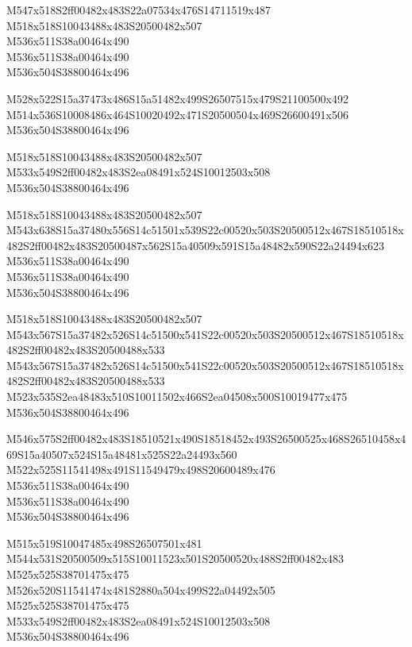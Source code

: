 \documentclass{article}
\begin{document}
\begin{multicols}{5}
\begin{center}
M547x518S2ff00482x483S22a07534x476S14711519x487 %
\\M518x518S10043488x483S20500482x507 %
\\M536x511S38a00464x490 %
\\M536x511S38a00464x490 %
\\M536x504S38800464x496 %

M528x522S15a37473x486S15a51482x499S26507515x479S21100500x492 %
\\M514x536S10008486x464S10020492x471S20500504x469S26600491x506 %
\\M536x504S38800464x496 %

M518x518S10043488x483S20500482x507 %
\\M533x549S2ff00482x483S2ea08491x524S10012503x508 %
\\M536x504S38800464x496 %

M518x518S10043488x483S20500482x507 %
\\M543x638S15a37480x556S14c51501x539S22c00520x503S20500512x467S18510518x482S2ff00482x483S20500487x562S15a40509x591S15a48482x590S22a24494x623 %
\\M536x511S38a00464x490 %
\\M536x511S38a00464x490 %
\\M536x504S38800464x496 %

M518x518S10043488x483S20500482x507 %
\\M543x567S15a37482x526S14c51500x541S22c00520x503S20500512x467S18510518x482S2ff00482x483S20500488x533 %
\\M543x567S15a37482x526S14c51500x541S22c00520x503S20500512x467S18510518x482S2ff00482x483S20500488x533 %
\\M523x535S2ea48483x510S10011502x466S2ea04508x500S10019477x475 %
\\M536x504S38800464x496 %

M546x575S2ff00482x483S18510521x490S18518452x493S26500525x468S26510458x469S15a40507x524S15a48481x525S22a24493x560 %
\\M522x525S11541498x491S11549479x498S20600489x476 %
\\M536x511S38a00464x490 %
\\M536x511S38a00464x490 %
\\M536x504S38800464x496 %

M515x519S10047485x498S26507501x481 %
\\M544x531S20500509x515S10011523x501S20500520x488S2ff00482x483 %
\\M525x525S38701475x475 %
\\M526x520S11541474x481S2880a504x499S22a04492x505 %
\\M525x525S38701475x475 %
\\M533x549S2ff00482x483S2ea08491x524S10012503x508 %
\\M536x504S38800464x496 %


\end{center}
\end{multicols}
\end{document}
